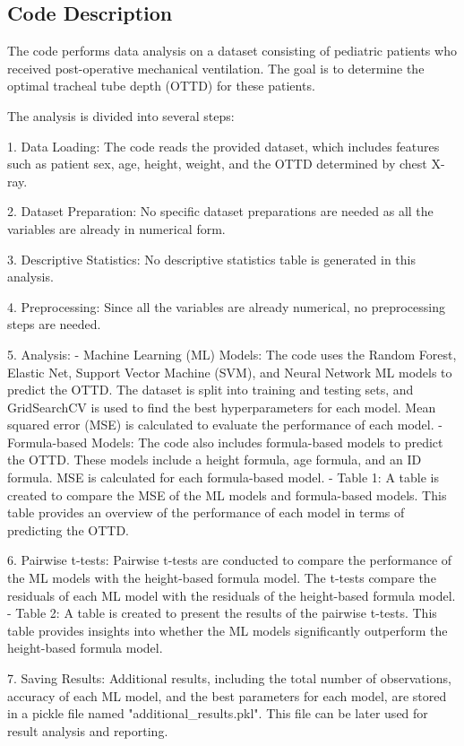 \documentclass[11pt]{article}
\begin{document}
\subsection{Code Description}

The code performs data analysis on a dataset consisting of pediatric patients who received post-operative mechanical ventilation. The goal is to determine the optimal tracheal tube depth (OTTD) for these patients.

The analysis is divided into several steps:

1. Data Loading: The code reads the provided dataset, which includes features such as patient sex, age, height, weight, and the OTTD determined by chest X-ray.

2. Dataset Preparation: No specific dataset preparations are needed as all the variables are already in numerical form.

3. Descriptive Statistics: No descriptive statistics table is generated in this analysis.

4. Preprocessing: Since all the variables are already numerical, no preprocessing steps are needed.

5. Analysis:
   - Machine Learning (ML) Models: The code uses the Random Forest, Elastic Net, Support Vector Machine (SVM), and Neural Network ML models to predict the OTTD. The dataset is split into training and testing sets, and GridSearchCV is used to find the best hyperparameters for each model. Mean squared error (MSE) is calculated to evaluate the performance of each model.
   - Formula-based Models: The code also includes formula-based models to predict the OTTD. These models include a height formula, age formula, and an ID formula. MSE is calculated for each formula-based model.
   - Table 1: A table is created to compare the MSE of the ML models and formula-based models. This table provides an overview of the performance of each model in terms of predicting the OTTD.
   
6. Pairwise t-tests: Pairwise t-tests are conducted to compare the performance of the ML models with the height-based formula model. The t-tests compare the residuals of each ML model with the residuals of the height-based formula model.
   - Table 2: A table is created to present the results of the pairwise t-tests. This table provides insights into whether the ML models significantly outperform the height-based formula model.

7. Saving Results: Additional results, including the total number of observations, accuracy of each ML model, and the best parameters for each model, are stored in a pickle file named "additional\_results.pkl". This file can be later used for result analysis and reporting.
\end{document}
